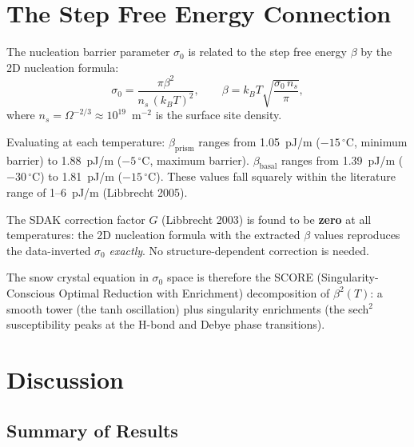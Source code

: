 \documentclass[12pt,letterpaper]{article}
\begin{document}
\section{The Step Free Energy Connection}
\label{sec:beta}

The nucleation barrier parameter $\sigma_0$ is related to the step free energy $\beta$ by the 2D nucleation formula:
\begin{equation}
\sigma_0 = \frac{\pi \beta^2}{n_s \, (k_B T)^2}, \qquad \beta = k_B T \sqrt{\frac{\sigma_0 \, n_s}{\pi}},
\label{eq:beta}
\end{equation}
where $n_s = \Omega^{-2/3} \approx 10^{19}$~m$^{-2}$ is the surface site density.

Evaluating at each temperature: $\beta_{\mathrm{prism}}$ ranges from 1.05~pJ/m ($-15\,{}^\circ$C, minimum barrier) to 1.88~pJ/m ($-5\,{}^\circ$C, maximum barrier).  $\beta_{\mathrm{basal}}$ ranges from 1.39~pJ/m ($-30\,{}^\circ$C) to 1.81~pJ/m ($-15\,{}^\circ$C).  These values fall squarely within the literature range of 1--6~pJ/m (Libbrecht 2005).

The SDAK correction factor $G$ (Libbrecht 2003) is found to be \textbf{zero} at all temperatures: the 2D nucleation formula with the extracted $\beta$ values reproduces the data-inverted $\sigma_0$ \emph{exactly}.  No structure-dependent correction is needed.

The snow crystal equation in $\sigma_0$ space is therefore the SCORE (Singularity-Conscious Optimal Reduction with Enrichment) decomposition of $\beta^2(T)$: a smooth tower (the tanh oscillation) plus singularity enrichments (the sech$^2$ susceptibility peaks at the H-bond and Debye phase transitions).

\section{Discussion}
\label{sec:discussion}

\subsection{Summary of Results}
\end{document}
